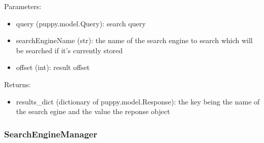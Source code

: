 \documentclass[letterpaper,10pt,english]{sphinxmanual}
\begin{document}
\begin{fulllineitems}
\begin{fulllineitems}
Parameters:
\begin{itemize}
\item {} 
query (puppy.model.Query): search query

\item {} 
searchEngineName (str): the name of the search engine to search which will be searched if it's currently stored

\item {} 
offset (int): result offset

\end{itemize}

Returns:
\begin{itemize}
\item {} 
results\_dict (dictionary of puppy.model.Response): the key being the name of the search egine and the value the reponse object

\end{itemize}

\end{fulllineitems}


\end{fulllineitems}



\subsubsection{SearchEngineManager}
\label{api3.0:searchenginemanager}
\end{document}
